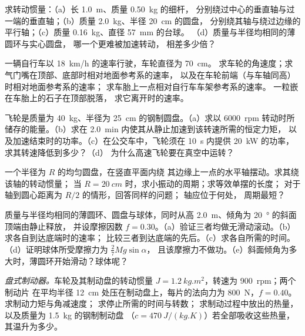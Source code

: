 \begin{exercise}[$\star$]\label{exo:b2:rigid-body-mechanics:1}
求转动惯量：（a）长 \qty{1.0}{m}、质量 \qty{0.50}{kg} 的细杆，
分别绕过中心的垂直轴与过一端的垂直轴；（b）质量 \qty{2.0}{kg}、半径 \qty{20}{cm} 的圆盘，
分别绕其轴与绕过边缘的平行轴；（c）质量 \qty{0.16}{kg}、直径 \qty{57}{mm} 的台球。
（d）质量与半径均相同的薄圆环与实心圆盘，
哪一个更难被加速转动，
相差多少倍？
\end{exercise}

\begin{exercise}[$\star$]\label{exo:b2:rigid-body-mechanics:2}
一辆自行车以 \qty{18}{km/h} 的速率行驶，车轮直径为 \qty{70}{cm}。
求车轮的角速度；求气门嘴在顶部、底部时相对地面参考系的速率，
以及在车轮前端（与车轴同高）时相对地面参考系的速率；
求车胎上一点相对自行车车架参考系的速率。
一粒嵌在车胎上的石子在顶部脱落，
求它离开时的速率。
\end{exercise}

\begin{exercise}[$\star$]\label{exo:b2:rigid-body-mechanics:3}
飞轮是质量为 \qty{40}{kg}、半径为 \qty{25}{cm} 的钢制圆盘。（a）求以
\qty{6000}{rpm} 转动时所储存的能量。（b）求在 \qty{2.0}{min} 内使其从静止加速到该转速所需的恒定力矩，
以及加速结束时的功率。（c）在公交车中，飞轮须在 \qty{10}{s} 内提供 \qty{20}{kW} 的功率，
求其转速降低到多少？（d）
为什么高速飞轮要在真空中运转？
\end{exercise}

\begin{exercise}[$\star$]\label{exo:b2:rigid-body-mechanics:4}
一个半径为 $R$ 的均匀圆盘，在竖直平面内绕
其边缘上一点的水平轴摆动。求其绕该轴的转动惯量；
当 $R = \qty{20}{cm}$ 时，求小振动的周期；求等效单摆的长度；
对于轴到圆心距离为 $R/2$ 的情形，回答同样的问题；
轴应位于何处，
周期最短？
\end{exercise}

\begin{exercise}[$\star\star$]\label{exo:b2:rigid-body-mechanics:5}
质量与半径均相同的薄圆环、圆盘与球体，同时从高 \qty{2.0}{m}、倾角为 \qty{20}{\degree} 的斜面顶端由静止释放，
并设摩擦因数 $f =
0.30$。（a）验证三者均做无滑动滚动。（b）求各自到达底端时的速率；
比较三者到达底端的先后。（c）求各自所需的时间。
（d）证明球体所受摩擦力为 $\tfrac27Mg\sin\alpha$，
且该摩擦力不做功。（e）斜面倾角为多大时，薄圆环开始滑动？球体呢？
\end{exercise}

\begin{exercise}[$\star\star$]\label{exo:b2:rigid-body-mechanics:6}
\emph{盘式制动器。}车轮及其制动盘的转动惯量 $J = \qty{1.2}{kg.m^2}$，转速为 \qty{900}{rpm}；两个制动片
在平均半径 \qty{12}{cm} 处压在制动盘上，每片的法向力为 \qty{800}{N}，$f = 0.40$。
求制动力矩与角减速度；
求停止所需的时间与转数；
求制动过程中放出的热量，以及质量为 \qty{1.5}{kg} 的钢制制动盘
（$c = \qty{470}{J/(kg.K)}$）若全部吸收这些热量，其温升为多少。
\end{exercise}

